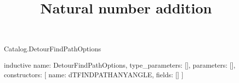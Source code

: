 \begin{lexlean}{Catalog.DetourFindPathOptions}
\title{Natural number addition}
\begin{semanticmodule}
inductive{
  name: DetourFindPathOptions,
  type_parameters: [],
  parameters: [],
  constructors: [
    {name: dTFINDPATHANYANGLE, fields: []}
  ]
}
\end{semanticmodule}
\end{lexlean}

